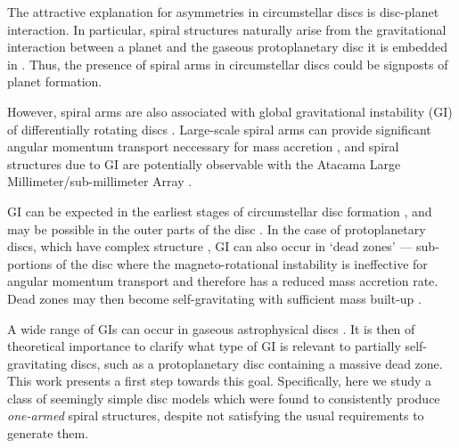 \documentclass[useAMS,usenatbib]{mn2e}
\begin{document}
The attractive explanation for asymmetries in circumstellar discs is
disc-planet interaction. In particular, spiral structures  
naturally arise from the gravitational interaction between a
planet and the gaseous protoplanetary disc it is embedded in
\citep[see, e.g.][for a recent review]{baruteau13b}. Thus, the
presence of spiral arms in circumstellar discs could be signposts of 
planet formation.  

However, spiral arms are also associated with global gravitational 
instability (GI) of differentially rotating discs
\citep{goldreich65,laughlin96b,laughlin98,nelson98,lodato05,forgan11}. Large-scale
spiral arms can provide significant angular momentum transport
neccessary for mass accretion \citep{lynden-bell72, papaloizou91,balbus99,lodato04}, and
spiral structures due to GI are potentially observable with the Atacama Large 
Millimeter/sub-millimeter Array \citep{cossins10,dipierror14}.   

GI can be expected in the earliest stages of 
circumstellar disc formation
\citep{kratter10b,inutsuka10,tsukamoto13}, and may be possible in the
outer parts of the disc \citep{rafikov05,matzner05,kimura12}.  
In the case of protoplanetary discs, which have complex structure
\citep{armitage10}, GI can also occur in `dead
zones' --- sub-portions of the disc where the magneto-rotational
instability is ineffective for angular momentum transport
\citep{gammie96,turner08,landry13} and therefore has a reduced mass
accretion rate. Dead zones may then become
self-gravitating with sufficient mass built-up
\citep{armitage01,martin12,martin12b,zhu09,zhu10,zhu10b,bae13,bae14}.   

A wide range of GIs can occur in  gaseous 
astrophysical discs 
\citep{papaloizou89,christo92,christo93,hadley11,hadley14}. It is then
of theoretical importance to clarify what type of GI is relevant to 
partially self-gravitating discs, such as a protoplanetary disc containing a 
massive dead zone.  %
This work presents a first step towards this goal. Specifically, here we 
study a class of seemingly simple disc models which were found to 
consistently produce \emph{one-armed} spiral structures, despite not 
satisfying the usual requirements to generate them. 

\end{document}
